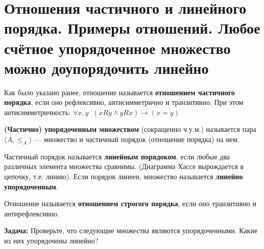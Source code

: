 \section{Отношения частичного и линейного порядка. Примеры отношений. Любое счётное упорядоченное множество можно доупорядочить линейно }
\par Как было указано ранее, отношение называется \textbf{отношением частичного порядка}, если оно рефлексивно, антисимметрично и транзитивно. При этом антисимметричность:  $\forall x,y \;\; (xRy \land yRx) \to (x=y)$
\\ \par \textbf{(Частично) упорядоченным множеством} (сокращенно ч.у.м.) называется пара $\langle A,\leq_A \rangle$ — множество и частичный порядок (отношение порядка) на нем.
\par Частичный порядок называется \textbf{линейным порядоком}, если любые два различных элемента множества сравнимы. (Диаграмма Хассе вырождается в цепочку, т.е. линию). Если порядок линеен, множество называется \textbf{линейно упорядоченным}.
\par Отношение называется \textbf{отношением строгого порядка}, если оно транзитивно и антирефлексивно.
\\ \par \textbf{Задача:} Проверьте, что следующие множества являются упорядоченными. Какие из них упорядочены линейно?
